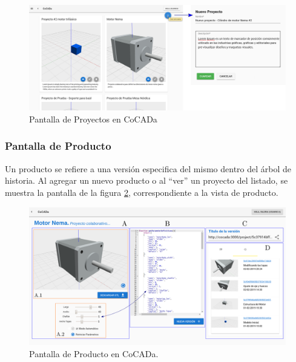\begin{figure}[h]
    \includegraphics[width=16cm]{Img/Desarrollo/cocada0.jpg}
    \centering
    \caption{\footnotesize{Pantalla de Proyectos en CoCADa%
    }}
     \label{fig:cocada1}
\end{figure}

\subsubsection{Pantalla de Producto}
Un producto se refiere a una versión especifica del mismo dentro del árbol de historia. 
Al agregar un nuevo producto o al ``ver'' un proyecto del listado, se muestra la pantalla de la figura \ref{fig:cocada2}, correspondiente a la vista de producto. 

\begin{figure}[ht]
    \includegraphics[width=16cm]{Img/Desarrollo/cocada-pantalla.png}
    \centering
    \caption{\footnotesize{Pantalla de Producto en CoCADa.}}
     \label{fig:cocada2}
\end{figure}

